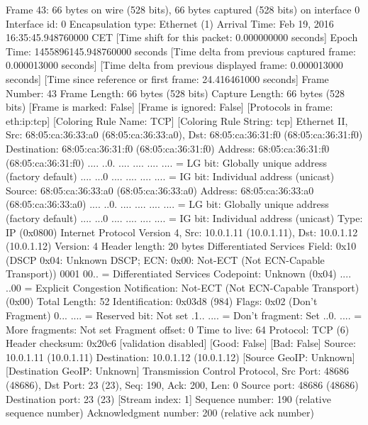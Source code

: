 Frame 43: 66 bytes on wire (528 bits), 66 bytes captured (528 bits) on interface 0
    Interface id: 0
    Encapsulation type: Ethernet (1)
    Arrival Time: Feb 19, 2016 16:35:45.948760000 CET
    [Time shift for this packet: 0.000000000 seconds]
    Epoch Time: 1455896145.948760000 seconds
    [Time delta from previous captured frame: 0.000013000 seconds]
    [Time delta from previous displayed frame: 0.000013000 seconds]
    [Time since reference or first frame: 24.416461000 seconds]
    Frame Number: 43
    Frame Length: 66 bytes (528 bits)
    Capture Length: 66 bytes (528 bits)
    [Frame is marked: False]
    [Frame is ignored: False]
    [Protocols in frame: eth:ip:tcp]
    [Coloring Rule Name: TCP]
    [Coloring Rule String: tcp]
Ethernet II, Src: 68:05:ca:36:33:a0 (68:05:ca:36:33:a0), Dst: 68:05:ca:36:31:f0 (68:05:ca:36:31:f0)
    Destination: 68:05:ca:36:31:f0 (68:05:ca:36:31:f0)
        Address: 68:05:ca:36:31:f0 (68:05:ca:36:31:f0)
        .... ..0. .... .... .... .... = LG bit: Globally unique address (factory default)
        .... ...0 .... .... .... .... = IG bit: Individual address (unicast)
    Source: 68:05:ca:36:33:a0 (68:05:ca:36:33:a0)
        Address: 68:05:ca:36:33:a0 (68:05:ca:36:33:a0)
        .... ..0. .... .... .... .... = LG bit: Globally unique address (factory default)
        .... ...0 .... .... .... .... = IG bit: Individual address (unicast)
    Type: IP (0x0800)
Internet Protocol Version 4, Src: 10.0.1.11 (10.0.1.11), Dst: 10.0.1.12 (10.0.1.12)
    Version: 4
    Header length: 20 bytes
    Differentiated Services Field: 0x10 (DSCP 0x04: Unknown DSCP; ECN: 0x00: Not-ECT (Not ECN-Capable Transport))
        0001 00.. = Differentiated Services Codepoint: Unknown (0x04)
        .... ..00 = Explicit Congestion Notification: Not-ECT (Not ECN-Capable Transport) (0x00)
    Total Length: 52
    Identification: 0x03d8 (984)
    Flags: 0x02 (Don't Fragment)
        0... .... = Reserved bit: Not set
        .1.. .... = Don't fragment: Set
        ..0. .... = More fragments: Not set
    Fragment offset: 0
    Time to live: 64
    Protocol: TCP (6)
    Header checksum: 0x20c6 [validation disabled]
        [Good: False]
        [Bad: False]
    Source: 10.0.1.11 (10.0.1.11)
    Destination: 10.0.1.12 (10.0.1.12)
    [Source GeoIP: Unknown]
    [Destination GeoIP: Unknown]
Transmission Control Protocol, Src Port: 48686 (48686), Dst Port: 23 (23), Seq: 190, Ack: 200, Len: 0
    Source port: 48686 (48686)
    Destination port: 23 (23)
    [Stream index: 1]
    Sequence number: 190    (relative sequence number)
    Acknowledgment number: 200    (relative ack number)
